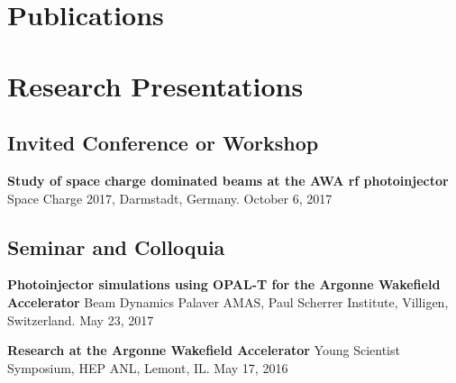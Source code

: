 \documentclass[11pt,a4paper,sans]{moderncv}        %
\begin{document}
\section{Publications}
%






\section{Research Presentations}

\subsection{Invited Conference or Workshop} %
\textbf{Study of space charge dominated beams at the AWA rf photoinjector}\newline
Space Charge 2017, Darmstadt, Germany. October 6, 2017

\subsection{Seminar and Colloquia}
\textbf{Photoinjector simulations using OPAL-T for the Argonne Wakefield Accelerator}\newline
Beam Dynamics Palaver AMAS, Paul Scherrer Institute, Villigen, Switzerland. May 23, 2017 
\vspace{0.3em}

\textbf{Research at the Argonne Wakefield Accelerator}\newline
Young Scientist Symposium, HEP ANL, Lemont, IL. May 17, 2016 
\vspace{0.3em}
\end{document}
